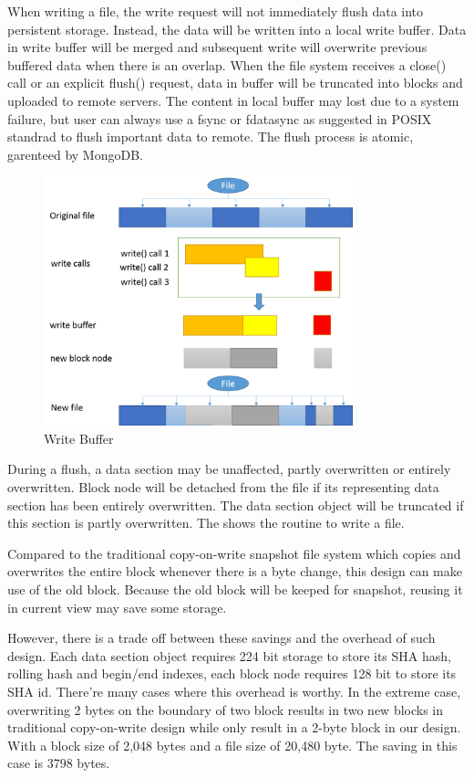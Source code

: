 	When writing a file, the write request will not immediately flush data into persistent storage. Instead, the data will be written into a local write buffer. Data in write buffer will be merged and subsequent write will overwrite previous buffered data when there is an overlap. When the file system receives a close() call or an explicit flush() request, data in buffer will be truncated into blocks and uploaded to remote servers. The content in local buffer may lost due to a system failure, but user can always use a fsync or fdatasync as suggested in POSIX standrad to flush important data to remote. The flush process is atomic, garenteed by MongoDB. 

\begin{figure}[hbtp]
\centering
\includegraphics[width=0.8\textwidth]{Chapter-3/figs/fig11.png}
\caption{Write Buffer}
\label{fig:buffer}
\end{figure}

	During a flush, a data section may be unaffected, partly overwritten or entirely overwritten. Block node will be detached from the file if its representing data section has been entirely overwritten. The data section object will be truncated if this section is partly overwritten. The  shows the routine to write a file.

    Compared to the traditional copy-on-write snapshot file system which copies and overwrites the entire block whenever there is a byte change, this design can make use of the old block. Because the old block will be keeped for snapshot, reusing it in current view may save some storage.

    However, there is a trade off between these savings and the overhead of such design. Each data section object requires 224 bit storage to store its SHA hash, rolling hash and begin/end indexes, each block node requires 128 bit to store its SHA id. There're many cases where this overhead is worthy. In the extreme case, overwriting 2 bytes on the boundary of two block results in two new blocks in traditional copy-on-write design while only result in a 2-byte block in our design. With a block size of 2,048 bytes and a file size of 20,480 byte. The saving in this case is 3798 bytes.

